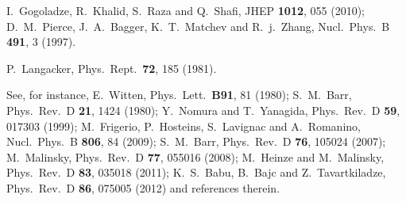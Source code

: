 \documentclass[12pt]{article}
\begin{document}
\begin{thebibliography}{99}
  I.~Gogoladze, R.~Khalid, S.~Raza and Q.~Shafi,
  JHEP {\bf 1012}, 055 (2010);
%
  D.~M.~Pierce, J.~A.~Bagger, K.~T.~Matchev and R.~j.~Zhang,
  Nucl.\ Phys.\ B {\bf 491}, 3 (1997).

  P.~Langacker,
  Phys.\ Rept.\  {\bf 72}, 185 (1981).

See, for instance, E.~Witten,
Phys.\ Lett.\  {\bf B91}, 81 (1980);
  S.~M.~Barr,
  Phys.\ Rev.\ D {\bf 21}, 1424 (1980);
  Y.~Nomura and T.~Yanagida,
  Phys.\ Rev.\ D {\bf 59}, 017303 (1999);
  M.~Frigerio, P.~Hosteins, S.~Lavignac and A.~Romanino,
  Nucl.\ Phys.\ B {\bf 806}, 84 (2009);
  S.~M.~Barr,
  Phys.\ Rev.\ D {\bf 76}, 105024 (2007);
  M.~Malinsky,
  Phys.\ Rev.\ D {\bf 77}, 055016 (2008);
  M.~Heinze and M.~Malinsky,
  Phys.\ Rev.\ D {\bf 83}, 035018 (2011);
  K.~S.~Babu, B.~Bajc and Z.~Tavartkiladze,
  Phys.\ Rev.\ D {\bf 86}, 075005 (2012)
   and references therein.


\end{thebibliography}
\end{document}
